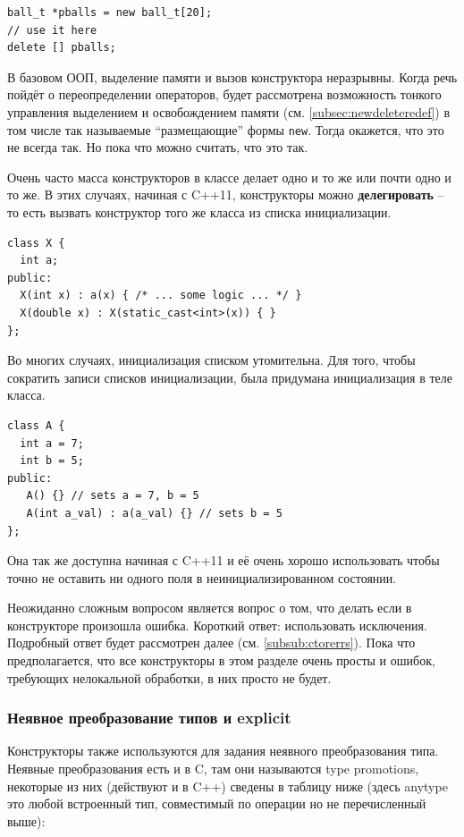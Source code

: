 \documentclass[a4paper,12pt,oneside]{article}
\begin{document}
\begin{lstlisting}
ball_t *pballs = new ball_t[20];
// use it here
delete [] pballs;
\end{lstlisting}

В базовом ООП, выделение памяти и вызов конструктора неразрывны. Когда речь пойдёт о переопределении операторов, будет рассмотрена возможность тонкого управления выделением и освобождением памяти (см. \ref{subsec:newdeleteredef}) в том числе так называемые ``размещающие'' формы \lstinline!new!. Тогда окажется, что это не всегда так. Но пока что можно считать, что это так.

Очень часто масса конструкторов в классе делает одно и то же или почти одно и то же. В этих случаях, начиная с C++11, конструкторы можно \textbf{делегировать} -- то есть вызвать конструктор того же класса из списка инициализации.

\begin{lstlisting}
class X {
  int a;
public:
  X(int x) : a(x) { /* ... some logic ... */ }
  X(double x) : X(static_cast<int>(x)) { }
};
\end{lstlisting}

Во многих случаях, инициализация списком утомительна. Для того, чтобы сократить записи списков инициализации, была придумана инициализация в теле класса.

\begin{lstlisting}
class A {
  int a = 7;
  int b = 5;  
public:
   A() {} // sets a = 7, b = 5
   A(int a_val) : a(a_val) {} // sets b = 5
};
\end{lstlisting}

Она так же доступна начиная с C++11 и её очень хорошо использовать чтобы точно не оставить ни одного поля в неинициализированном состоянии.

Неожиданно сложным вопросом является вопрос о том, что делать если в конструкторе произошла ошибка. Короткий ответ: использовать исключения. Подробный ответ будет рассмотрен далее (см. \ref{subsub:ctorerrs}). Пока что предполагается, что все конструкторы в этом разделе очень просты и ошибок, требующих нелокальной обработки, в них просто не будет.

\subsubsection{Неявное преобразование типов и explicit}\label{Explicit}

Конструкторы также используются для задания неявного преобразования типа. Неявные преобразования есть и в C, там они называются type promotions, некоторые из них (действуют и в C++) сведены в таблицу ниже (здесь anytype это любой встроенный тип, совместимый по операции но не перечисленный выше):
\end{document}
